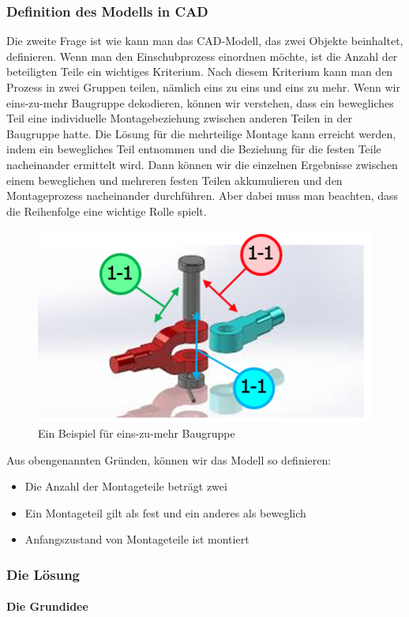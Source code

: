 \documentclass[14pt,a4paper,titlepage]{article}
\begin{document}
		\subsubsection{Definition des Modells in CAD}
		Die zweite Frage ist wie kann man das CAD-Modell, das zwei Objekte beinhaltet, definieren. Wenn man den Einschubprozess einordnen möchte, ist die Anzahl der beteiligten Teile ein wichtiges Kriterium. Nach diesem Kriterium kann man den Prozess in zwei Gruppen teilen, nämlich eins zu eins und eins zu mehr.  
		\bigbreak
		Wenn wir eins-zu-mehr Baugruppe dekodieren, können wir verstehen, dass ein bewegliches Teil eine individuelle Montagebeziehung zwischen anderen Teilen in der Baugruppe hatte. Die Lösung für die mehrteilige Montage kann erreicht werden, indem ein bewegliches Teil entnommen und die Beziehung für die festen Teile nacheinander ermittelt wird. Dann können wir die einzelnen Ergebnisse zwischen einem beweglichen und mehreren festen Teilen akkumulieren und den Montageprozess nacheinander durchführen. Aber dabei muss man beachten, dass die Reihenfolge eine wichtige Rolle spielt.\\
			\begin{figure}[h!]
			\centering
			\includegraphics[width=0.5\linewidth]{eins-zu-mehr.png}
			\caption{Ein Beispiel für eins-zu-mehr Baugruppe}
			\end{figure}
		Aus obengenannten Gründen, können wir das Modell so definieren:
			\begin{itemize}
				\item Die Anzahl der Montageteile beträgt zwei
				\item Ein Montageteil gilt als fest und ein anderes als beweglich
				\item Anfangszustand von Montageteile ist montiert
			\end{itemize}
		\subsubsection{Die Lösung}
			\paragraph{Die Grundidee}
			
\end{document}
